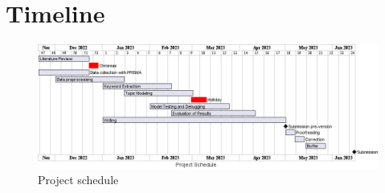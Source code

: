 \chapter{Timeline}
\label{ch:timeline}
 \begin{figure}[ht]
    \includegraphics[width=\textwidth]{images/timeline.png}
    \caption{Project schedule}
    \label{fig:timeline}
 \end{figure}